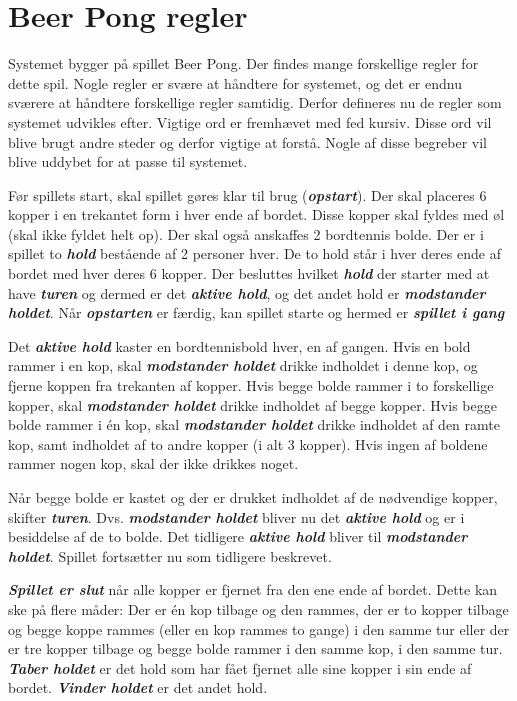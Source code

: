 \documentclass[Kravspecifikation/Kravspec_Main.tex]{subfiles}
\begin{document}
\section{Beer Pong regler} \label{sec:rules}
Systemet bygger på spillet Beer Pong. Der findes mange forskellige regler for dette spil. Nogle regler er svære at håndtere for systemet, og det er endnu sværere at håndtere forskellige regler samtidig. Derfor defineres nu de regler som systemet udvikles efter. Vigtige ord er fremhævet med fed kursiv. Disse ord vil blive brugt andre steder og derfor vigtige at forstå. Nogle af disse begreber vil blive uddybet for at passe til systemet.

Før spillets start, skal spillet gøres klar til brug (\textit{\textbf{opstart}}). Der skal placeres 6 kopper i en trekantet form i hver ende af bordet. Disse kopper skal fyldes med øl (skal ikke fyldet helt op). Der skal også anskaffes 2 bordtennis bolde.  Der er i spillet to \textit{\textbf{hold}} bestående af 2 personer hver. De to hold står i hver deres ende af bordet med hver deres 6 kopper. Der besluttes hvilket \textit{\textbf{hold}} der starter med at have \textit{\textbf{turen}} og dermed er det \textit{\textbf{aktive hold}}, og det andet hold er \textit{\textbf{modstander holdet}}.  Når \textit{\textbf{opstarten}} er færdig, kan spillet starte og hermed er \textit{\textbf{spillet i gang}}

Det \textit{\textbf{aktive hold}} kaster en bordtennisbold hver, en af gangen. Hvis en bold rammer i en kop, skal \textit{\textbf{modstander holdet}} drikke indholdet i denne kop, og fjerne koppen fra trekanten af kopper. Hvis begge bolde rammer i to forskellige kopper, skal \textit{\textbf{modstander holdet}} drikke indholdet af begge kopper. Hvis begge bolde rammer i én kop, skal \textit{\textbf{modstander holdet}} drikke indholdet af den ramte kop, samt indholdet af to andre kopper (i alt 3 kopper). Hvis ingen af boldene rammer nogen kop, skal der ikke drikkes noget.

Når begge bolde er kastet og der er drukket indholdet af de nødvendige kopper, skifter \textit{\textbf{turen}}. Dvs. \textit{\textbf{modstander holdet}} bliver nu det \textit{\textbf{aktive hold}} og er i besiddelse af de to bolde. Det tidligere \textit{\textbf{aktive hold}} bliver til \textit{\textbf{modstander holdet}}. Spillet fortsætter nu som tidligere beskrevet.

\textit{\textbf{Spillet er slut}} når alle kopper er fjernet fra den ene ende af bordet. Dette kan ske på flere måder: Der er én kop tilbage og den rammes, der er to kopper tilbage og begge koppe rammes (eller en kop rammes to gange) i den samme tur eller der er tre kopper tilbage og begge bolde rammer i den samme kop, i den samme tur. \textit{\textbf{Taber holdet}} er det hold som har fået fjernet alle sine kopper i sin ende af bordet. \textit{\textbf{Vinder holdet}} er det andet hold. 
\end{document}
